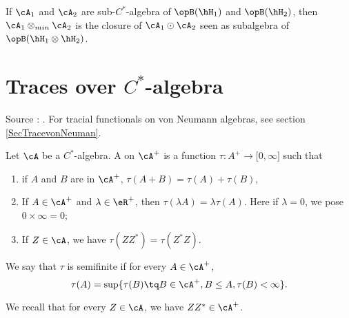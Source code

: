 \begin{lemma}
    If $\cA_1$ and $\cA_2$ are sub-$C^*$-algebra of $\opB(\hH_1)$ and $\opB(\hH_2)$, then $\cA_1\otimes_{min}\cA_2$ is the closure of $\cA_1\odot\cA_2$ seen as subalgebra of $\opB(\hH_1\otimes\hH_2)$.
\end{lemma}


\section{Traces over $C^*$-algebra }
\label{SecTraceCstar}

Source : \cite{DixmierTrace}. For tracial functionals on von Neumann algebras, see section \ref{SecTracevonNeuman}.

\begin{definition}
    Let $\cA$ be a $C^*$-algebra. A  on $\cA^+$ is a function $\tau\colon A^+\to \mathopen[ 0 , \infty \mathclose]$ such that
    \begin{enumerate}
        \item
            if $A$ and $B$ are in $\cA^+$, $\tau(A+B)=\tau(A)+\tau(B)$,
        \item
            If $A\in\cA^+$ and $\lambda\in\eR^+$, then $\tau(\lambda A)=\lambda\tau(A)$. Here if $\lambda=0$, we pose $0\times\infty=0$;
        \item
            If $Z\in\cA$, we have $\tau(ZZ^*)=\tau(Z^*Z)$.
    \end{enumerate}
    We say that $\tau$ is semifinite if for every $A\in\cA^+$,
    \begin{equation}
        \tau(A)=\sup\{ \tau(B)\tq B\in\cA^+,B\leq A,\tau(B)<\infty \}.
    \end{equation}
\end{definition}
We recall that for every $Z\in\cA$, we have $ZZ^*\in\cA^+$.

